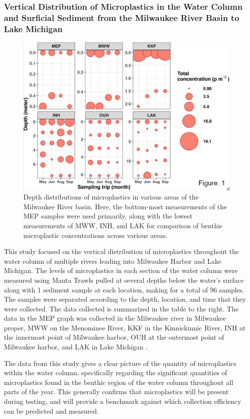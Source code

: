 \documentclass[fleqn,10pt]{SelfArx} %
\begin{document}
	\subsubsection*{Vertical Distribution of Microplastics in the Water Column and Surficial Sediment from the Milwaukee River Basin to Lake Michigan}
	\begin{figure}[H]
		\centering
		\includegraphics[width=0.8\linewidth]{Figures/DepthDistribution.png}
		\caption[Vertical MP Distribution]{Depth distributions of microplastics in various areas of the Milwaukee River basin. Here, the bottom-most measurements of the MEP samples were used primarily, along with the lowest measurements of MWW, INH, and LAK for comparison of benthic microplastic concentrations across various areas.}
		\label{fig:VerticalDepthDist}
	\end{figure}
	This study focused on the vertical distribution of microplastics throughout the water column of multiple rivers leading into Milwaukee Harbor and Lake Michigan. The levels of microplastics in each section of the water column were measured using Manta Trawls pulled at several depths below the water’s surface along with 1 sediment sample at each location, making for a total of 96 samples. The samples were separated according to the depth, location, and time that they were collected. The data collected is summarized in the table to the right. The data in the MEP graph was collected in the Milwaukee river in Milwaukee proper, MWW on the Menominee River, KKF in the Kinnickinnic River, INH at the innermost point of Milwaukee harbor, OUH at the outermost point of Milwaukee harbor, and LAK in Lake Michigan \cite{LenakerEtAlvertdist}.
	
	The data from this study gives a clear picture of the quantity of microplastics within the water column, specifically regarding the significant quantities of microplastics found in the benthic region of the water column throughout all parts of the year. This generally confirms that microplastics will be present during testing, and will provide a benchmark against which collection efficiency can be predicted and measured.
	
\end{document}
